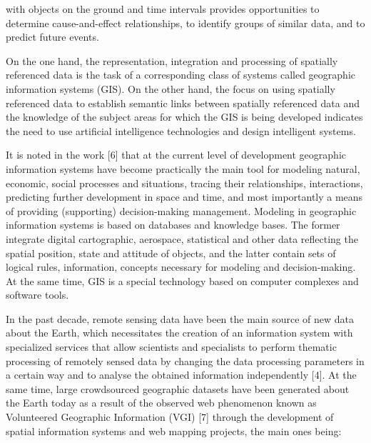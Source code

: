 \documentclass[a4paper]{article}
\begin{document}
\setlength\parindent{10pt}
\fontsize{10}{13}\selectfont

\begin{multicols}{2}

{\setlength{\parindent}{0pt} %
 {
with objects on the ground and time intervals provides
opportunities to determine cause-and-effect relationships,
to identify groups of similar data, and to predict future
events.}}

{\fontsize{9.92}{13}\selectfont On the one hand, the representation, integration and
processing of spatially referenced data is the task of a
corresponding class of systems called geographic information systems (GIS). On the other hand, the focus on
using spatially referenced data to establish semantic links
between spatially referenced data and the knowledge of
the subject areas for which the GIS is being developed indicates the need to use artificial intelligence technologies
and design intelligent systems.
\par


It is noted in the work [6] that at the current level
of development geographic information systems have
become practically the main tool for modeling natural,
economic, social processes and situations, tracing their
relationships, interactions, predicting further development in space and time, and most importantly a means
of providing (supporting) decision-making management.
Modeling in geographic information systems is based
on databases and knowledge bases. The former integrate
digital cartographic, aerospace, statistical and other data
reflecting the spatial position, state and attitude of objects,
and the latter contain sets of logical rules, information,
concepts necessary for modeling and decision-making.
At the same time, GIS is a special technology based on
computer complexes and software tools.\par

 In the past decade, remote sensing data have been
the main source of new data about the Earth, which
necessitates the creation of an information system with
specialized services that allow scientists and specialists to perform thematic processing of remotely sensed
data by changing the data processing parameters in a
certain way and to analyse the obtained information
independently [4]. At the same time, large crowdsourced
geographic datasets have been generated about the Earth
today as a result of the observed web phenomenon
known as Volunteered Geographic Information (VGI) [7]
through the development of spatial information systems
and web mapping projects, the main ones being:\par


}
\end{multicols}
\end{document}
